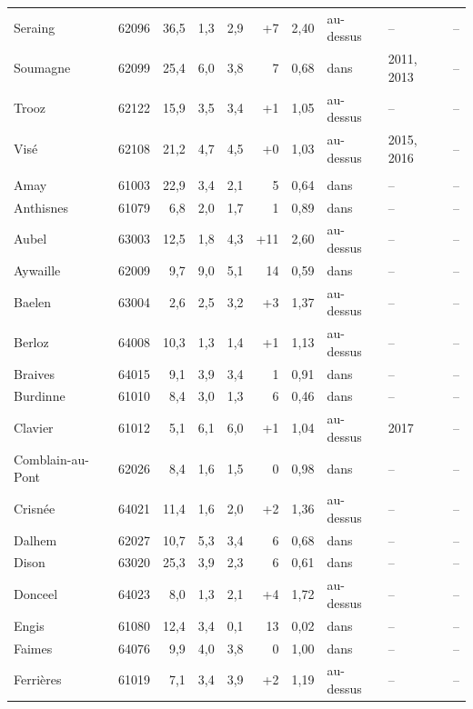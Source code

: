 \begin{longtable}{lrrrrrrlll}
Seraing & 62096 & 36{,}5 & 1{,}3 & 2{,}9 & +7 & 2{,}40 & au-dessus & -- & -- \\
Soumagne & 62099 & 25{,}4 & 6{,}0 & 3{,}8 & \textminus{}7 & 0{,}68 & dans & 2011, 2013 & -- \\
Trooz & 62122 & 15{,}9 & 3{,}5 & 3{,}4 & +1 & 1{,}05 & au-dessus & -- & -- \\
Visé & 62108 & 21{,}2 & 4{,}7 & 4{,}5 & +0 & 1{,}03 & au-dessus & 2015, 2016 & -- \\
\addlinespace
\multicolumn{10}{l}{\textbf{Liège 2} (55 communes)} \\
Amay & 61003 & 22{,}9 & 3{,}4 & 2{,}1 & \textminus{}5 & 0{,}64 & dans & -- & -- \\
Anthisnes & 61079 & 6{,}8 & 2{,}0 & 1{,}7 & \textminus{}1 & 0{,}89 & dans & -- & -- \\
Aubel & 63003 & 12{,}5 & 1{,}8 & 4{,}3 & +11 & 2{,}60 & au-dessus & -- & -- \\
Aywaille & 62009 & 9{,}7 & 9{,}0 & 5{,}1 & \textminus{}14 & 0{,}59 & dans & -- & -- \\
Baelen & 63004 & 2{,}6 & 2{,}5 & 3{,}2 & +3 & 1{,}37 & au-dessus & -- & -- \\
Berloz & 64008 & 10{,}3 & 1{,}3 & 1{,}4 & +1 & 1{,}13 & au-dessus & -- & -- \\
Braives & 64015 & 9{,}1 & 3{,}9 & 3{,}4 & \textminus{}1 & 0{,}91 & dans & -- & -- \\
Burdinne & 61010 & 8{,}4 & 3{,}0 & 1{,}3 & \textminus{}6 & 0{,}46 & dans & -- & -- \\
Clavier & 61012 & 5{,}1 & 6{,}1 & 6{,}0 & +1 & 1{,}04 & au-dessus & 2017 & -- \\
Comblain-au-Pont & 62026 & 8{,}4 & 1{,}6 & 1{,}5 & \textminus{}0 & 0{,}98 & dans & -- & -- \\
Crisnée & 64021 & 11{,}4 & 1{,}6 & 2{,}0 & +2 & 1{,}36 & au-dessus & -- & -- \\
Dalhem & 62027 & 10{,}7 & 5{,}3 & 3{,}4 & \textminus{}6 & 0{,}68 & dans & -- & -- \\
Dison & 63020 & 25{,}3 & 3{,}9 & 2{,}3 & \textminus{}6 & 0{,}61 & dans & -- & -- \\
Donceel & 64023 & 8{,}0 & 1{,}3 & 2{,}1 & +4 & 1{,}72 & au-dessus & -- & -- \\
Engis & 61080 & 12{,}4 & 3{,}4 & 0{,}1 & \textminus{}13 & 0{,}02 & dans & -- & -- \\
Faimes & 64076 & 9{,}9 & 4{,}0 & 3{,}8 & \textminus{}0 & 1{,}00 & dans & -- & -- \\
Ferrières & 61019 & 7{,}1 & 3{,}4 & 3{,}9 & +2 & 1{,}19 & au-dessus & -- & -- \\

\end{longtable}

